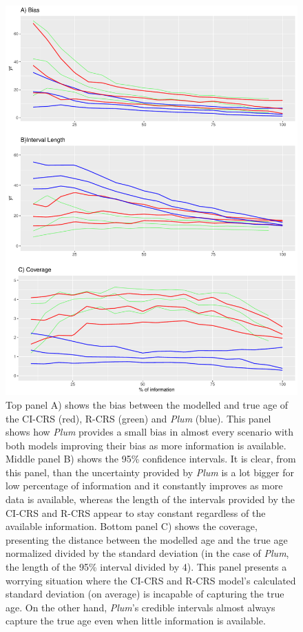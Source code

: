 \documentclass [10pt] {article}
\begin{document}
\begin{figure}[!]
 \centering
  \includegraphics[width=.75\linewidth]{AccPrec.pdf}
	\caption{Top panel A) shows the bias between the modelled and true age of the CI-CRS (red), R-CRS (green) and \textit{Plum} (blue). This panel shows how \textit{Plum} provides a small bias in almost every scenario with both models improving their bias as more information is available. Middle panel B) shows the 95\% confidence intervals. It is clear, from this panel, than the uncertainty provided by \textit{Plum} is a lot bigger for low percentage of information and it constantly improves as more data is available, whereas the length of the intervals provided by the CI-CRS and R-CRS appear to stay constant regardless of the available information. Bottom panel C) shows the coverage, presenting the distance between the modelled age and the true age normalized divided by the standard deviation (in the case of \textit{Plum}, the length of the 95\% interval divided by 4). This panel presents a worrying situation where the CI-CRS and R-CRS model's calculated standard deviation (on average) is incapable of capturing the true age. On the other hand, \textit{Plum}'s credible intervals almost always capture the true age even when little information is available.}
  \label{fig:accpre}
\end{figure}
\end{document}
